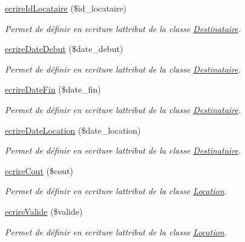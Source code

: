 \begin{DoxyCompactItemize}
\hyperlink{class_location_a7c548de14b0775bd29c5ff6402a75a0f}{ecrire\+Id\+Locataire} (\$id\+\_\+locataire)
\begin{DoxyCompactList}\small\item\em Permet de définir en ecriture l\textquotesingle{}attribut de la classe \hyperlink{class_destinataire}{Destinataire}. \end{DoxyCompactList}\item 
\hyperlink{class_location_a70c7958200c34c3df4110390e11f8bcd}{ecrire\+Date\+Debut} (\$date\+\_\+debut)
\begin{DoxyCompactList}\small\item\em Permet de définir en ecriture l\textquotesingle{}attribut de la classe \hyperlink{class_destinataire}{Destinataire}. \end{DoxyCompactList}\item 
\hyperlink{class_location_a84998ce017d5d9716e0c264352d33587}{ecrire\+Date\+Fin} (\$date\+\_\+fin)
\begin{DoxyCompactList}\small\item\em Permet de définir en ecriture l\textquotesingle{}attribut de la classe \hyperlink{class_destinataire}{Destinataire}. \end{DoxyCompactList}\item 
\hyperlink{class_location_a6f5f309c7c5620fe23f6ebd74c244a88}{ecrire\+Date\+Location} (\$date\+\_\+location)
\begin{DoxyCompactList}\small\item\em Permet de définir en ecriture l\textquotesingle{}attribut de la classe \hyperlink{class_destinataire}{Destinataire}. \end{DoxyCompactList}\item 
\hyperlink{class_location_a3190a299ed70340cd0cf5a96c4441f95}{ecrire\+Cout} (\$cout)
\begin{DoxyCompactList}\small\item\em Permet de définir en ecriture l\textquotesingle{}attribut de la classe \hyperlink{class_location}{Location}. \end{DoxyCompactList}\item 
\hyperlink{class_location_a8b7b36fcfac26bd53bd8dacc23754af1}{ecrire\+Valide} (\$valide)
\begin{DoxyCompactList}\small\item\em Permet de définir en ecriture l\textquotesingle{}attribut de la classe \hyperlink{class_location}{Location}. \end{DoxyCompactList}\item 

\end{DoxyCompactItemize}
